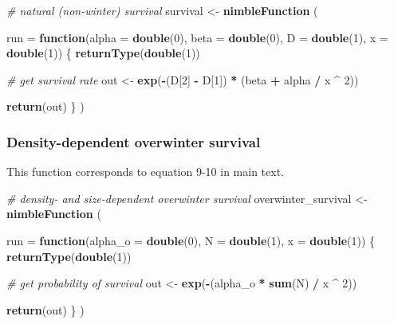 \documentclass[
]{article}
\newenvironment{Shaded}{\begin{snugshade}}{\end{snugshade}}
\newcommand{\AttributeTok}[1]{\textcolor[rgb]{0.13,0.29,0.53}{#1}}
\newcommand{\CommentTok}[1]{\textcolor[rgb]{0.56,0.35,0.01}{\textit{#1}}}
\newcommand{\ControlFlowTok}[1]{\textcolor[rgb]{0.13,0.29,0.53}{\textbf{#1}}}
\newcommand{\DecValTok}[1]{\textcolor[rgb]{0.00,0.00,0.81}{#1}}
\newcommand{\FunctionTok}[1]{\textcolor[rgb]{0.13,0.29,0.53}{\textbf{#1}}}
\newcommand{\NormalTok}[1]{#1}
\newcommand{\OtherTok}[1]{\textcolor[rgb]{0.56,0.35,0.01}{#1}}
\newcommand{\SpecialCharTok}[1]{\textcolor[rgb]{0.81,0.36,0.00}{\textbf{#1}}}
\begin{document}
\begin{Shaded}
\begin{Highlighting}[]
\CommentTok{\# natural (non{-}winter) survival}
\NormalTok{survival }\OtherTok{\textless{}{-}} \FunctionTok{nimbleFunction}\NormalTok{ (}
  
  \AttributeTok{run =} \ControlFlowTok{function}\NormalTok{(}\AttributeTok{alpha =} \FunctionTok{double}\NormalTok{(}\DecValTok{0}\NormalTok{), }\AttributeTok{beta =} \FunctionTok{double}\NormalTok{(}\DecValTok{0}\NormalTok{), }\AttributeTok{D =} \FunctionTok{double}\NormalTok{(}\DecValTok{1}\NormalTok{),}
                 \AttributeTok{x =} \FunctionTok{double}\NormalTok{(}\DecValTok{1}\NormalTok{))}
\NormalTok{  \{}
    \FunctionTok{returnType}\NormalTok{(}\FunctionTok{double}\NormalTok{(}\DecValTok{1}\NormalTok{))}
    
    \CommentTok{\# get survival rate}
\NormalTok{    out }\OtherTok{\textless{}{-}} \FunctionTok{exp}\NormalTok{(}\SpecialCharTok{{-}}\NormalTok{(D[}\DecValTok{2}\NormalTok{] }\SpecialCharTok{{-}}\NormalTok{ D[}\DecValTok{1}\NormalTok{]) }\SpecialCharTok{*}\NormalTok{ (beta }\SpecialCharTok{+}\NormalTok{ alpha }\SpecialCharTok{/}\NormalTok{ x }\SpecialCharTok{\^{}} \DecValTok{2}\NormalTok{))}

    \FunctionTok{return}\NormalTok{(out)}
\NormalTok{  \}}
\NormalTok{)}
\end{Highlighting}
\end{Shaded}

\subsubsection{Density-dependent overwinter
survival}\label{density-dependent-overwinter-survival}

This function corresponds to equation 9-10 in main text.

\begin{Shaded}
\begin{Highlighting}[]
\CommentTok{\# density{-} and size{-}dependent overwinter survival}
\NormalTok{overwinter\_survival }\OtherTok{\textless{}{-}} \FunctionTok{nimbleFunction}\NormalTok{ (}
  
  \AttributeTok{run =} \ControlFlowTok{function}\NormalTok{(}\AttributeTok{alpha\_o =} \FunctionTok{double}\NormalTok{(}\DecValTok{0}\NormalTok{), }\AttributeTok{N =} \FunctionTok{double}\NormalTok{(}\DecValTok{1}\NormalTok{),}
                 \AttributeTok{x =} \FunctionTok{double}\NormalTok{(}\DecValTok{1}\NormalTok{))}
\NormalTok{  \{}
    \FunctionTok{returnType}\NormalTok{(}\FunctionTok{double}\NormalTok{(}\DecValTok{1}\NormalTok{))}
    
    \CommentTok{\# get probability of survival}
\NormalTok{    out }\OtherTok{\textless{}{-}} \FunctionTok{exp}\NormalTok{(}\SpecialCharTok{{-}}\NormalTok{(alpha\_o }\SpecialCharTok{*} \FunctionTok{sum}\NormalTok{(N) }\SpecialCharTok{/}\NormalTok{ x }\SpecialCharTok{\^{}} \DecValTok{2}\NormalTok{))}

    \FunctionTok{return}\NormalTok{(out)}
\NormalTok{  \}}
\NormalTok{)}
\end{Highlighting}
\end{Shaded}
\end{document}
